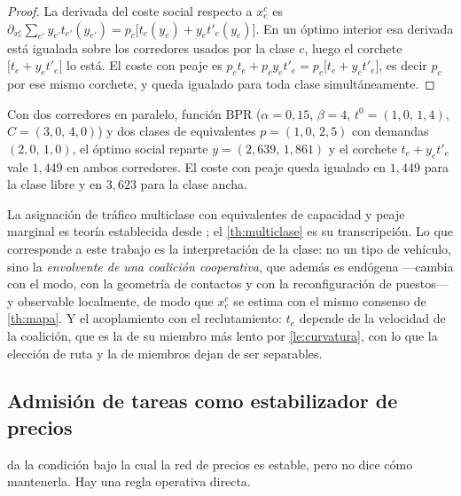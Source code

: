 \begin{proof}
La derivada del coste social respecto a $x^c_e$ es
$\partial_{x^c_e}\sum_{e'}y_{e'}t_{e'}(y_{e'})
=p_c\bigl[t_e(y_e)+y_e t'_e(y_e)\bigr]$.
En un óptimo interior esa derivada está igualada sobre los corredores usados por
la clase $c$, luego el corchete $\bigl[t_e+y_et'_e\bigr]$ lo está. El coste con
peaje es $p_c t_e+p_c y_e t'_e=p_c\bigl[t_e+y_e t'_e\bigr]$, es decir $p_c$ por
ese mismo corchete, y queda igualado para toda clase simultáneamente.
\end{proof}

\begin{observacion}
\label{obs:multiclase-num}
Con dos corredores en paralelo, función BPR
($\alpha=0{,}15$, $\beta=4$, $t^0=(1{,}0,\,1{,}4)$, $C=(3{,}0,\,4{,}0)$) y dos
clases de equivalentes $p=(1{,}0,\,2{,}5)$ con demandas $(2{,}0,\,1{,}0)$, el
óptimo social reparte $y=(2{,}639,\,1{,}861)$ y el corchete
$t_e+y_et'_e$ vale $1{,}449$ en ambos corredores. El coste con peaje queda
igualado en $1{,}449$ para la clase libre y en $3{,}623$ para la clase ancha.
\end{observacion}

\begin{observacion}
\label{obs:multiclase-atrib}
La asignación de tráfico multiclase con equivalentes de capacidad y peaje
marginal es teoría establecida desde \cite{dafermos1972multiclass}; el
\cref{th:multiclase} es su transcripción. Lo que corresponde a este trabajo es
la interpretación de la clase: no un tipo de vehículo, sino la
\emph{envolvente de una coalición cooperativa}, que además es endógena —cambia
con el modo, con la geometría de contactos y con la reconfiguración de puestos—
y observable localmente, de modo que $x^c_e$ se estima con el mismo consenso de
\cref{th:mapa}. Y el acoplamiento con el reclutamiento: $t_e$ depende de la
velocidad de la coalición, que es la de su miembro más lento por
\cref{le:curvatura}, con lo que la elección de ruta y la de miembros dejan de
ser separables.
\end{observacion}

\subsection{Admisión de tareas como estabilizador de precios}

 da la condición bajo la cual la red de precios es estable,
pero no dice cómo mantenerla. Hay una regla operativa directa.

